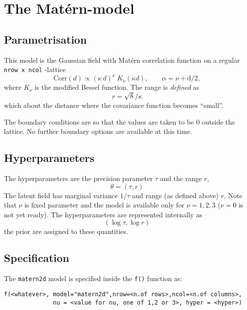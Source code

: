 \documentclass[a4paper,11pt]{article}
\begin{document}



\section*{The Mat\'ern-model}
\subsection*{Parametrisation}

This model is the Gaussian field with Mat\'ern correlation function on
a regular \verb|nrow x ncol| -lattice
\begin{displaymath}
    \text{Corr}(d)
    \propto
    \left(\kappa\, {d}\right)^{\nu}
    \;
    K_{\nu}( \kappa d), \qquad \alpha = \nu + \text{d}/2,
\end{displaymath}
where $K_{\nu}$ is the modified Bessel function. The range is
\emph{defined} as
\begin{displaymath}
    r = {\sqrt{8}}/{\kappa}
\end{displaymath}
which about the distance where the covariance function becomes
``small''.

The boundary conditions are so that the values are taken to be $0$
outside the lattice. No further boundary options are available at this
time.

\subsection*{Hyperparameters}

The hyperparameters are the precision parameter $\tau$ and the range
$r$,
\begin{displaymath}
    \theta = (\tau, r)
\end{displaymath}
The latent field has marginal variance $1/\tau$ and range (as defined
above) $r$. Note that $\nu$ is fixed parameter and the model is
available only for $\nu=1,2,3$ ($\nu=0$ is not yet ready).  The
hyperparameters are represented internally as
\begin{displaymath}
    (\log\tau, \log r)
\end{displaymath}
the prior are assigned to these quantities.

\subsection*{Specification}

The {\tt matern2d} model is specified inside the {\tt f()} function as:
\begin{verbatim}
f(<whatever>, model="matern2d",nrow=<n.of rows>,ncol=<n.of columns>,
              nu = <value for nu, one of 1,2 or 3>, hyper = <hyper>)
\end{verbatim}
\end{document}
